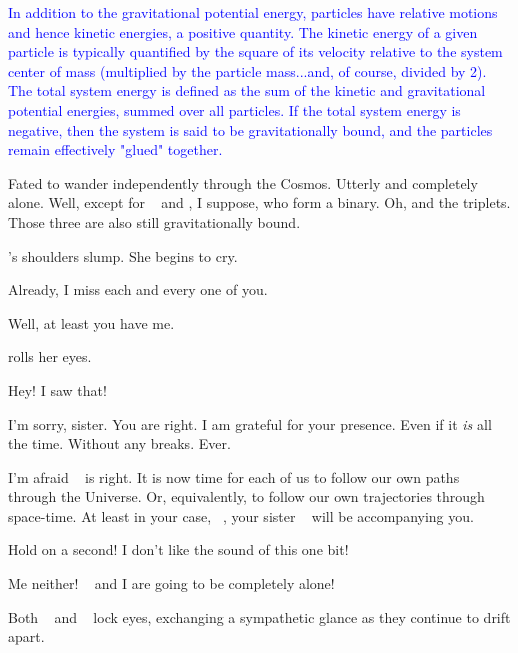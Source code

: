 \documentclass[main.tex]{subfiles}
\begin{document}
\par \textcolor{blue} {\nar In addition to the gravitational potential energy, particles have relative motions and hence kinetic energies, a positive quantity.  The kinetic energy of a given particle is typically quantified by the square of its velocity relative to the system center of mass (multiplied by the particle mass...and, of course, divided by 2).  The total system energy is defined as the sum of the kinetic and gravitational potential energies, summed over all particles.  If the total system energy is negative, then the system is said to be gravitationally bound, and the particles remain effectively "glued" together.}  

\par \Sterope Fated to wander independently through the Cosmos.  Utterly and completely alone.  Well, except for \rmmaia~ and \rmmerope, I suppose, who form a binary.  Oh, and the triplets.  Those three are also still gravitationally bound.

\par \nar \rmalcyone's shoulders slump.  She begins to cry.

\par \Alcyone Already, I miss each and every one of you.

\par \Taygete Well, at least you have me.

\par \nar \rmalcyone rolls her eyes.

\par \Taygete Hey!  I saw that!

\par \Alcyone I'm sorry, sister.  You are right.  I am grateful for your presence.  Even if it \textit{is} all the time.  Without any breaks.  Ever.

\par \Maia I'm afraid \rmalcyone~ is right.  It is now time for each of us to follow our own paths through the Universe.  Or, equivalently, to follow our own trajectories through space-time.  At least in your case, \rmtaygete~, your sister \rmalcyone~ will be accompanying you.

\par \Electra Hold on a second!  I don't like the sound of this one bit!

\par \Sterope Me neither! \rmelectra~ and I are going to be completely alone!

\par \nar Both \rmsterope~ and \rmelectra~ lock eyes, exchanging a sympathetic glance as they continue to drift apart.  
\end{document}
